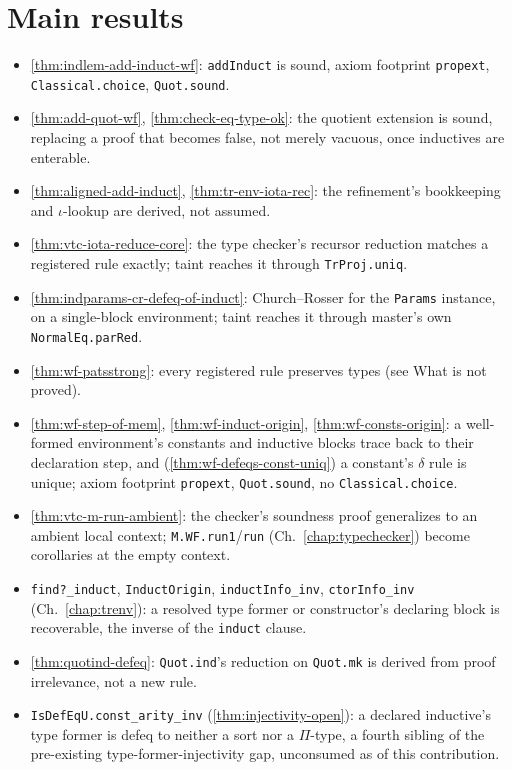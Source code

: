 \section{Main results}
\label{sec:contrib-iota-claims}
\begin{itemize}
\item \stProved{} \ref{thm:indlem-add-induct-wf}: \texttt{addInduct} is sound, axiom
footprint \texttt{propext}, \texttt{Classical.choice}, \texttt{Quot.sound}.
\item \stProved{} \ref{thm:add-quot-wf}, \ref{thm:check-eq-type-ok}: the quotient extension
is sound, replacing a proof that becomes false, not merely vacuous, once inductives are
enterable.
\item \stProved{} \ref{thm:aligned-add-induct}, \ref{thm:tr-env-iota-rec}: the refinement's
bookkeeping and $\iota$-lookup are derived, not assumed.
\item \stTainted{} \ref{thm:vtc-iota-reduce-core}: the type checker's recursor reduction
matches a registered rule exactly; taint reaches it through \texttt{TrProj.uniq}.
\item \stTainted{} \ref{thm:indparams-cr-defeq-of-induct}: Church--Rosser for the
\texttt{Params} instance, on a single-block environment; taint reaches it through master's
own \texttt{NormalEq.parRed}.
\item \stSorry{} \ref{thm:wf-patsstrong}: every registered rule preserves types (see What is
not proved).
\item \stProved{} \ref{thm:wf-step-of-mem}, \ref{thm:wf-induct-origin},
\ref{thm:wf-consts-origin}: a well-formed environment's constants and inductive blocks trace
back to their declaration step, and (\ref{thm:wf-defeqs-const-uniq}) a constant's $\delta$
rule is unique; axiom footprint \texttt{propext}, \texttt{Quot.sound}, no
\texttt{Classical.choice}.
\item \stProved{} \ref{thm:vtc-m-run-ambient}: the checker's soundness proof generalizes to an
ambient local context; \texttt{M.WF.run1}/\texttt{run} (Ch.~\ref{chap:typechecker}) become
corollaries at the empty context.
\item \stProved{} \texttt{find?\_induct}, \texttt{InductOrigin}, \texttt{inductInfo\_inv},
\texttt{ctorInfo\_inv} (Ch.~\ref{chap:trenv}): a resolved type former or constructor's
declaring block is recoverable, the inverse of the \texttt{induct} clause.
\item \stProved{} \ref{thm:quotind-defeq}: \texttt{Quot.ind}'s reduction on \texttt{Quot.mk}
is derived from proof irrelevance, not a new rule.
\item \stSorry{} \texttt{IsDefEqU.const\_arity\_inv} (\ref{thm:injectivity-open}): a declared
inductive's type former is defeq to neither a sort nor a $\Pi$-type, a fourth sibling of the
pre-existing type-former-injectivity gap, unconsumed as of this contribution.
\end{itemize}

